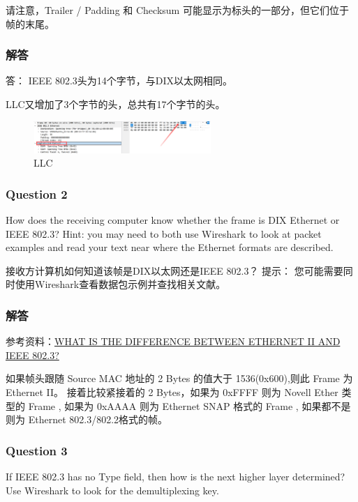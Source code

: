 \documentclass[14pt,a4paper,UTF8,twoside]{article}
\begin{document}
请注意，Trailer / Padding 和 Checksum 可能显示为标头的一部分，但它们位于帧的末尾。

\subsubsection*{解答}
答： IEEE 802.3头为14个字节，与DIX以太网相同。

LLC又增加了3个字节的头，总共有17个字节的头。

\begin{figure}[H]
  \centering
  \includegraphics[width=0.6\textwidth]{lab2/llcmore.png}
  \caption{LLC}
\end{figure}

\subsubsection{Question 2}
How does the receiving computer know whether the frame is DIX Ethernet or IEEE 802.3? Hint: you may need to both use Wireshark to look at packet examples and read your text near where the Ethernet formats are described.

接收方计算机如何知道该帧是DIX以太网还是IEEE 802.3？ 提示：
您可能需要同时使用Wireshark查看数据包示例并查找相关文献。

\subsubsection*{解答}
  参考资料：\href{https://www.globalknowledge.com/us-en/resources/resource-library/articles/what-is-the-difference-between-ethernet-ii-and-ieee-8023/}{WHAT IS THE DIFFERENCE BETWEEN ETHERNET II AND IEEE 802.3?}

如果帧头跟随 Source MAC 地址的 2 Bytes 的值大于 1536(0x600),则此 Frame 为 Ethernet II。
接着比较紧接着的 2 Bytes，如果为 0xFFFF 则为 Novell Ether 类型的 Frame ,
如果为 0xAAAA 则为 Ethernet SNAP 格式的 Frame , 如果都不是则为 Ethernet 802.3/802.2格式的帧。


\subsubsection{Question 3}
If IEEE 802.3 has no Type field, then how is the next higher layer determined? Use Wireshark to look for the demultiplexing key.
\end{document}
